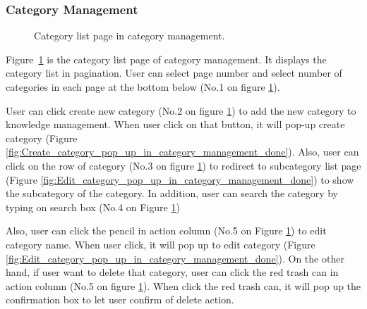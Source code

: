 \documentclass[12pt,oneside,openright,a4paper]{cpe-english-project}
\begin{document}
	\subsubsection{Category Management}
		\begin{figure}[!h]\centering
			\caption{Category list page in category management.}\label{fig:Category_list_page_in_category_management_done}
		\end{figure}
		\begin{flushleft}
			Figure~\ref*{fig:Category_list_page_in_category_management_done} is the category list page of category management. It displays the category list in pagination. User can select page number and select number of categories in each page at the bottom below (No.1 on figure \ref*{fig:Category_list_page_in_category_management_done}).
		\end{flushleft}
		\begin{flushleft}
			User can click create new category (No.2 on figure \ref*{fig:Category_list_page_in_category_management_done}) to add the new category to knowledge management. When user click on that button, it will pop-up create category (Figure \ref*{fig:Create_category_pop_up_in_category_management_done}). Also, user can click on the row of category (No.3 on figure \ref*{fig:Category_list_page_in_category_management_done}) to redirect to subcategory list page (Figure \ref*{fig:Edit_category_pop_up_in_category_management_done}) to show the subcategory of the category. In addition, user can search the category by typing on search box (No.4 on Figure \ref*{fig:Category_list_page_in_category_management_done})
		\end{flushleft}
		\begin{flushleft}
			Also, user can click the pencil in action column (No.5 on Figure \ref*{fig:Category_list_page_in_category_management_done}) to edit category name. When user click, it will pop up to edit category (Figure \ref*{fig:Edit_category_pop_up_in_category_management_done}). On the other hand, if user want to delete that category, user can click the red trash can in action column (No.5 on figure \ref*{fig:Category_list_page_in_category_management_done}). When click the red trash can, it will pop up the confirmation box to let user confirm of delete action.
		\end{flushleft}
\end{document}
